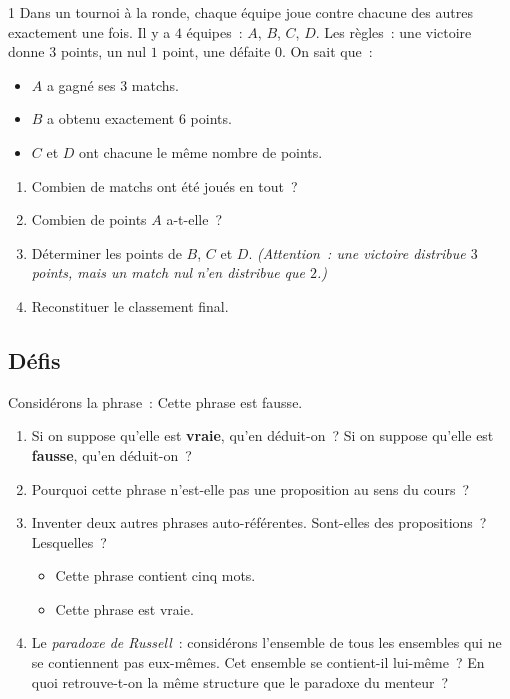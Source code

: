 \begin{probleme}{1}
Dans un tournoi \`a la ronde, chaque \'equipe joue contre chacune des autres
exactement une fois. Il y a $4$ \'equipes~: $A$, $B$, $C$, $D$.
Les r\`egles~: une victoire donne $3$ points, un nul $1$ point, une d\'efaite $0$.
On sait que~:
\begin{itemize}
  \item $A$ a gagn\'e ses $3$ matchs.
  \item $B$ a obtenu exactement $6$ points.
  \item $C$ et $D$ ont chacune le m\^eme nombre de points.
\end{itemize}
\begin{enumerate}
  \item Combien de matchs ont \'et\'e jou\'es en tout~?
  \item Combien de points $A$ a-t-elle~?
  \item D\'eterminer les points de $B$, $C$ et $D$.
        \emph{(Attention~: une victoire distribue $3$ points, mais un match nul
        n'en distribue que $2$.)}
  \item Reconstituer le classement final.
\end{enumerate}
\end{probleme}

\subsection*{D\'efis}

\begin{challenge}
Consid\'erons la phrase~: \og Cette phrase est fausse.\fg
\begin{enumerate}
  \item Si on suppose qu'elle est \textbf{vraie}, qu'en d\'eduit-on~?
        Si on suppose qu'elle est \textbf{fausse}, qu'en d\'eduit-on~?
  \item Pourquoi cette phrase n'est-elle pas une proposition au sens
        du cours~?
  \item Inventer deux autres phrases auto-r\'ef\'erentes.
        Sont-elles des propositions~? Lesquelles~?
        \begin{itemize}
          \item \og Cette phrase contient cinq mots.\fg
          \item \og Cette phrase est vraie.\fg
        \end{itemize}
  \item Le \emph{paradoxe de Russell}~: consid\'erons \og l'ensemble de tous
        les ensembles qui ne se contiennent pas eux-m\^emes\fg.
        Cet ensemble se contient-il lui-m\^eme~?
        En quoi retrouve-t-on la m\^eme structure que le paradoxe du menteur~?
\end{enumerate}
\end{challenge}

